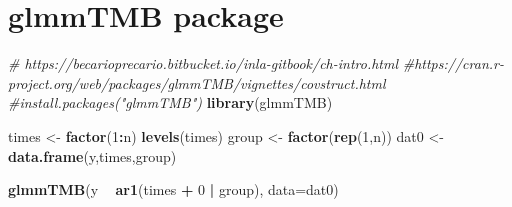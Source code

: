 \documentclass[]{book}
\newenvironment{Shaded}{\begin{snugshade}}{\end{snugshade}}
\newcommand{\KeywordTok}[1]{\textcolor[rgb]{0.13,0.29,0.53}{\textbf{#1}}}
\newcommand{\DataTypeTok}[1]{\textcolor[rgb]{0.13,0.29,0.53}{#1}}
\newcommand{\DecValTok}[1]{\textcolor[rgb]{0.00,0.00,0.81}{#1}}
\newcommand{\StringTok}[1]{\textcolor[rgb]{0.31,0.60,0.02}{#1}}
\newcommand{\CommentTok}[1]{\textcolor[rgb]{0.56,0.35,0.01}{\textit{#1}}}
\newcommand{\OperatorTok}[1]{\textcolor[rgb]{0.81,0.36,0.00}{\textbf{#1}}}
\newcommand{\NormalTok}[1]{#1}
\begin{document}
\section{glmmTMB package}\label{glmmtmb-package}

\begin{Shaded}
\begin{Highlighting}[]
\CommentTok{# https://becarioprecario.bitbucket.io/inla-gitbook/ch-intro.html}
\CommentTok{#https://cran.r-project.org/web/packages/glmmTMB/vignettes/covstruct.html}
\CommentTok{#install.packages("glmmTMB")}
\KeywordTok{library}\NormalTok{(glmmTMB)}

\NormalTok{times <-}\StringTok{ }\KeywordTok{factor}\NormalTok{(}\DecValTok{1}\OperatorTok{:}\NormalTok{n)}
\KeywordTok{levels}\NormalTok{(times)}
\NormalTok{group <-}\StringTok{ }\KeywordTok{factor}\NormalTok{(}\KeywordTok{rep}\NormalTok{(}\DecValTok{1}\NormalTok{,n))}
\NormalTok{dat0 <-}\StringTok{ }\KeywordTok{data.frame}\NormalTok{(y,times,group)}

\KeywordTok{glmmTMB}\NormalTok{(y }\OperatorTok{~}\StringTok{ }\KeywordTok{ar1}\NormalTok{(times }\OperatorTok{+}\StringTok{ }\DecValTok{0} \OperatorTok{|}\StringTok{ }\NormalTok{group), }\DataTypeTok{data=}\NormalTok{dat0)}
\end{Highlighting}
\end{Shaded}


\end{document}
